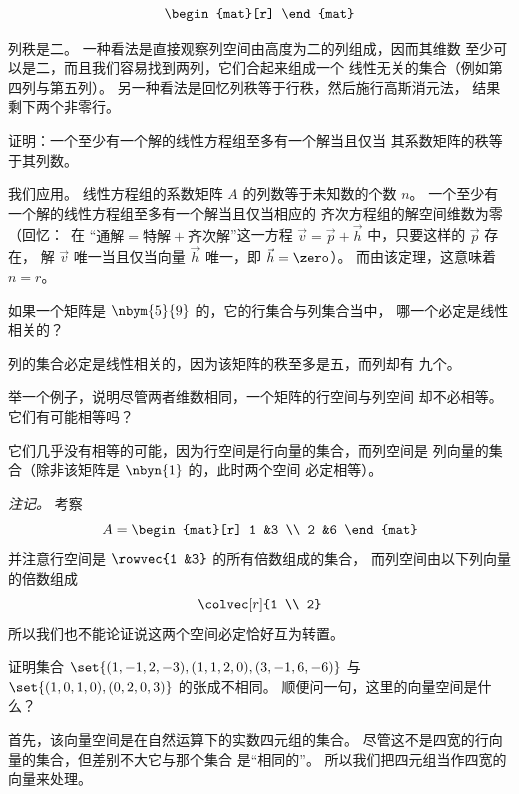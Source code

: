 \begin{exercises}
\begin{equation*}
\begin{mat}[r]
      \end{mat}
    \end{equation*}
    \begin{answer}
      列秩是二。
      一种看法是直接观察\Dash 列空间由高度为二的列组成，因而其维数
      至少可以是二，而且我们容易找到两列，它们合起来组成一个
      线性无关的集合（例如第四列与第五列）。
      另一种看法是回忆列秩等于行秩，然后施行高斯消元法，
      结果剩下两个非零行。
    \end{answer}
  \item
    证明：一个至少有一个解的线性方程组至多有一个解当且仅当
    其系数矩阵的秩等于其列数。
    \begin{answer}
      我们应用。
      线性方程组的系数矩阵 $A$ 的列数等于未知数的个数 $n$。
      一个至少有一个解的线性方程组至多有一个解当且仅当相应的
      齐次方程组的解空间维数为零（回忆：~在
      “$\text{通解}=\text{特解}+\text{齐次解}$”这一方程
       $\vec{v}=\vec{p}+\vec{h}$ 中，只要这样的 $\vec{p}$ 存在，
       解 $\vec{v}$ 唯一当且仅当向量 $\vec{h}$ 唯一，即 $\vec{h}=\zero$）。
       而由该定理，这意味着 $n=r$。
    \end{answer}
  \recommended \item
    如果一个矩阵是 \( \nbym{5}{9} \) 的，它的行集合与列集合当中，
    哪一个必定是线性相关的？
    \begin{answer}
      列的集合必定是线性相关的，因为该矩阵的秩至多是五，而列却有
      九个。
    \end{answer}
  \item
    举一个例子，说明尽管两者维数相同，一个矩阵的行空间与列空间
    却不必相等。
    它们有可能相等吗？
    \begin{answer}
      它们几乎没有相等的可能，因为行空间是行向量的集合，而列空间是
      列向量的集合（除非该矩阵是 \( \nbyn{1} \) 的，此时两个空间
      必定相等）。

      \textit{注记。}
      考察
      \begin{equation*}
        A=\begin{mat}[r]
            1  &3  \\
            2  &6
          \end{mat}
      \end{equation*}
      并注意行空间是 \( \rowvec{1 &3} \) 的所有倍数组成的集合，
      而列空间由以下列向量的倍数组成
      \begin{equation*}
        \colvec[r]{1 \\ 2}
      \end{equation*}
      所以我们也不能论证说这两个空间必定恰好互为转置。
    \end{answer}
  \item
    证明集合
    \( \set{(1,-1,2,-3),(1,1,2,0),(3,-1,6,-6)} \) 与
    \( \set{(1,0,1,0),(0,2,0,3)} \) 的张成不相同。
    顺便问一句，这里的向量空间是什么？
    \begin{answer}
      首先，该向量空间是在自然运算下的实数四元组的集合。
      尽管这不是四宽的行向量的集合，但差别不大\Dash 它与那个集合
      是“相同的”。
      所以我们把四元组当作四宽的向量来处理。


\end{answer}
\end{exercises}
